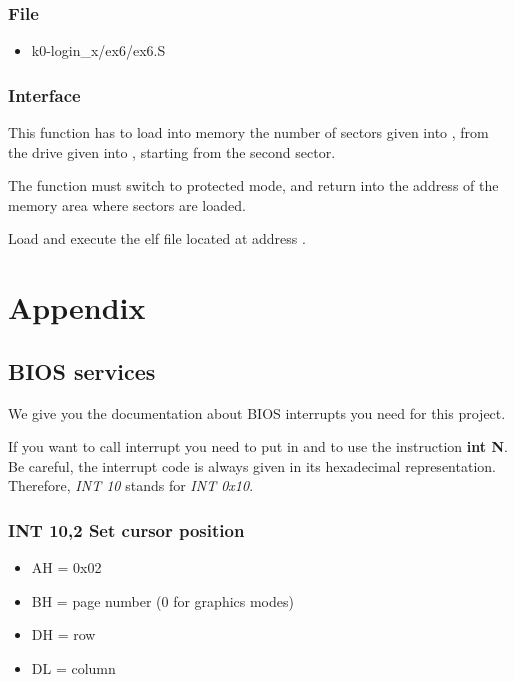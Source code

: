 \subsection*{File}
\begin{itemize}
  \item k0-login\_x/ex6/ex6.S
\end{itemize}

\subsection*{Interface}

{
  This function has to load into memory the number of sectors given into
  , from the drive given into , starting from
  the second sector.

  The function must switch to protected mode, and return into 
  the address of the memory area where sectors are loaded.
}

{
  Load and execute the elf file located at address .
}

%
%

\chapter{Appendix}

%
%

\section{BIOS services}

We give you the documentation about BIOS interrupts you need for this
project.

If you want to call interrupt  you need to put  in
 and to use the instruction \textbf{int N}. Be careful, the
interrupt code is always given in its hexadecimal representation. Therefore,
\emph{INT 10} stands for \emph{INT 0x10}.

%
%
\subsection{INT 10,2 Set cursor position}
\begin{itemize}
  \item
    AH = 0x02
  \item
    BH = page number (0 for graphics modes)
  \item
    DH = row
  \item
    DL = column
\end{itemize}

